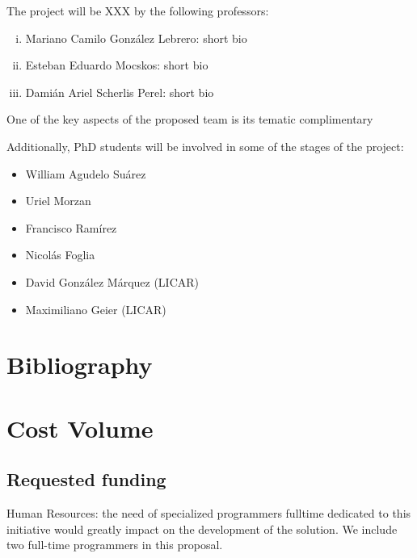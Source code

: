 \documentclass[a4paper,10pt]{article}
\begin{document}
The project will be XXX  by the following professors:
\begin{enumerate}[i)]

\item Mariano Camilo Gonz\'alez Lebrero: short bio

\item Esteban Eduardo Mocskos: short bio

\item Dami\'an Ariel Scherlis Perel: short bio

\end{enumerate}

One of the key aspects of the proposed team is its tematic complimentary 

Additionally, PhD students will be involved in some of the stages of the project:
\begin{itemize}
\item William Agudelo Su\'arez

\item Uriel Morzan

\item Francisco Ram\'irez

\item Nicol\'as Foglia 

\item David Gonz\'alez M\'arquez (LICAR)

\item Maximiliano Geier (LICAR)

\end{itemize}


\newpage

\section{Bibliography}

\newpage

\section{Cost Volume}

\subsection{Requested funding}

Human Resources: the need of specialized programmers fulltime dedicated to this initiative would greatly impact on the development of the solution. We include two full-time programmers in this proposal.
\end{document}
